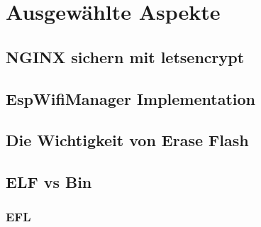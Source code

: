 \chapter{Ausgewählte Aspekte}

\section{NGINX sichern mit letsencrypt}

\section{EspWifiManager Implementation}

\section{Die Wichtigkeit von Erase Flash}

\section{ELF vs Bin}

\subsection{EFL}
